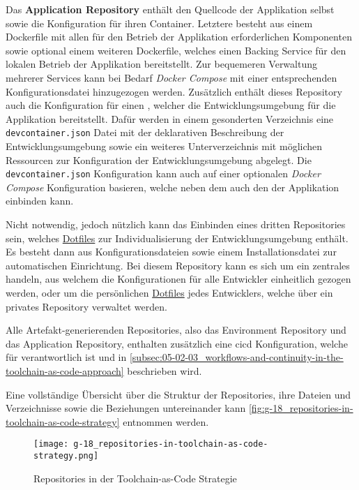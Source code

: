 Das \textbf{Application Repository} enthält den Quellcode der Applikation selbst sowie die Konfiguration für ihren Container. Letztere besteht aus einem Dockerfile mit allen für den Betrieb der Applikation erforderlichen Komponenten sowie optional einem weiteren Dockerfile, welches einen Backing Service für den lokalen Betrieb der Applikation bereitstellt. Zur bequemeren Verwaltung mehrerer Services kann bei Bedarf \textit{Docker Compose} mit einer entsprechenden Konfigurationsdatei hinzugezogen werden. Zusätzlich enthält dieses Repository auch die Konfiguration für einen , welcher die Entwicklungsumgebung für die Applikation bereitstellt. \linebreak[4]
Dafür werden in einem gesonderten Verzeichnis eine \texttt{devcontainer.json} Datei mit der deklarativen Beschreibung der Entwicklungsumgebung sowie ein weiteres Unterverzeichnis mit möglichen Ressourcen zur Konfiguration der Entwicklungsumgebung abgelegt. Die \texttt{devcontainer.json} Konfiguration kann auch auf einer optionalen \textit{Docker Compose} Konfiguration basieren, welche neben dem  auch den  der Applikation einbinden kann.

Nicht notwendig, jedoch nützlich kann das Einbinden eines dritten Repositories sein, welches \hyperref[sec:03-04_dotfiles]{Dotfiles} zur Individualisierung der Entwicklungsumgebung enthält. Es besteht dann aus Konfigurationsdateien sowie einem Installationsdatei zur automatischen Einrichtung. Bei diesem Repository kann es sich um ein zentrales handeln, aus welchem die Konfigurationen für alle Entwickler einheitlich gezogen werden, oder um die persönlichen \hyperref[sec:03-04_dotfiles]{Dotfiles} jedes Entwicklers, welche über ein privates Repository verwaltet werden.

Alle Artefakt-generierenden Repositories, also das Environment Repository und das Application Repository, enthalten zusätzlich eine \Gls{cicd} Konfiguration, welche für  verantwortlich ist und in \autoref{subsec:05-02-03_workflows-and-continuity-in-the-toolchain-as-code-approach} beschrieben wird.

Eine vollständige Übersicht über die Struktur der Repositories, ihre Dateien und Verzeichnisse sowie die Beziehungen untereinander kann \autoref{fig:g-18_repositories-in-toolchain-as-code-strategy} entnommen werden.

\begin{figure}[htp]
    \centering
    \texttt{[image: g-18\_repositories-in-toolchain-as-code-strategy.png]}
    \caption{Repositories in der Toolchain-as-Code Strategie}
    \label{fig:g-18_repositories-in-toolchain-as-code-strategy}
\end{figure}


